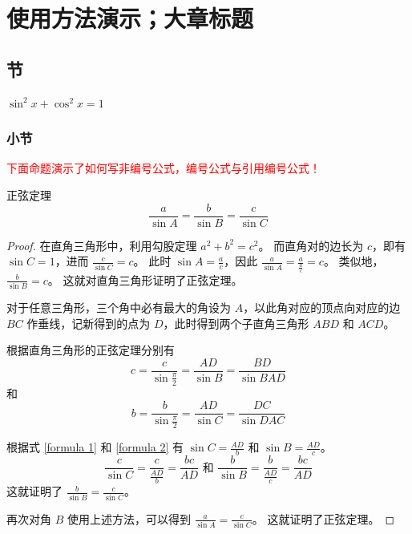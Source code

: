 \chapter{使用方法演示；大章标题}

\section{节}

\begin{axiom}
    $\sin^2 x + \cos^2 x = 1$
\end{axiom}

\subsection{小节}

\textcolor{red}{下面命题演示了如何写非编号公式，编号公式与引用编号公式！}
\begin{proposition} 正弦定理
    \[
        \frac{a}{\sin A} = \frac{b}{\sin B} = \frac{c}{\sin C}
    \]
    \begin{proof}
        在直角三角形中，利用勾股定理 $a^2 + b^2 = c^2$。
        而直角对的边长为 $c$，即有 $\sin C = 1$，进而 $\frac{c}{\sin C} = c$。
        此时 $\sin A = \frac{a}{c}$，因此 $\frac{a}{\sin A} = \frac{a}{\frac{a}{c}} = c$。
        类似地，$\frac{b}{\sin B} = c$。
        这就对直角三角形证明了正弦定理。

        对于任意三角形，三个角中必有最大的角设为 $A$，以此角对应的顶点向对应的边 $BC$ 作垂线，记新得到的点为 $D$，此时得到两个子直角三角形 $ABD$ 和 $ACD$。
        
        根据直角三角形的正弦定理分别有
        \begin{equation}\label{formula 1}
            c = \frac{c}{\sin \frac{\pi}{2}} = \frac{AD}{\sin B} = \frac{BD}{\sin BAD}
        \end{equation}
        和
        \begin{equation}\label{formula 2}
            b = \frac{b}{\sin \frac{\pi}{2}} = \frac{AD}{\sin C} = \frac{DC}{\sin DAC}
        \end{equation}
        
        根据式 \ref{formula 1} 和 \ref{formula 2} 有 $\sin C = \frac{AD}{b}$ 和 $\sin B = \frac{AD}{c}$。
        \[
            \frac{c}{\sin C} = \frac{c}{\frac{AD}{b}} = \frac{bc}{AD}
            \text{ 和 }
            \frac{b}{\sin B} = \frac{b}{\frac{AD}{c}} = \frac{bc}{AD}
        \]
        这就证明了 $\frac{b}{\sin B} = \frac{c}{\sin C}$。

        再次对角 $B$ 使用上述方法，可以得到 $\frac{a}{\sin A} = \frac{c}{\sin C}$。
        这就证明了正弦定理。
    \end{proof}
\end{proposition}

